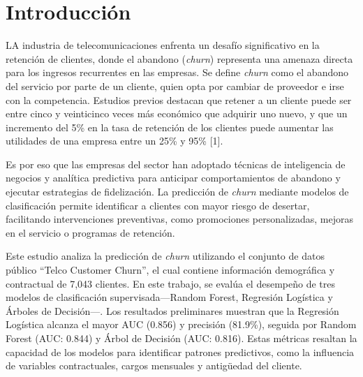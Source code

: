 \documentclass[conference]{IEEEtran}
\begin{document}

\section{Introducción}
LA industria de telecomunicaciones enfrenta un desafío significativo en la retención de clientes, donde el abandono (\emph{churn}) representa una amenaza directa para los ingresos recurrentes en las empresas. Se define \emph{churn} como el abandono del servicio por parte de un cliente, quien opta por cambiar de proveedor e irse con la competencia. Estudios previos destacan que retener a un cliente puede ser entre cinco y veinticinco veces más económico que adquirir uno nuevo, y que un incremento del 5\% en la tasa de retención de los clientes puede aumentar las utilidades de una empresa entre un 25\% y 95\% [1].

Es por eso que las empresas del sector han adoptado técnicas de inteligencia de negocios y analítica predictiva para anticipar comportamientos de abandono y ejecutar estrategias de fidelización. La predicción de \emph{churn} mediante modelos de clasificación permite identificar a clientes con mayor riesgo de desertar, facilitando intervenciones preventivas, como promociones personalizadas, mejoras en el servicio o programas de retención.

Este estudio analiza la predicción de \emph{churn} utilizando el conjunto de datos público “Telco Customer Churn”, el cual contiene información demográfica y contractual de 7,043 clientes. En este trabajo, se evalúa el desempeño de tres modelos de clasificación supervisada—Random Forest, Regresión Logística y Árboles de Decisión—. Los resultados preliminares muestran que la Regresión Logística alcanza el mayor AUC (0.856) y precisión (81.9\%), seguida por Random Forest (AUC: 0.844) y Árbol de Decisión (AUC: 0.816). Estas métricas resaltan la capacidad de los modelos para identificar patrones predictivos, como la influencia de variables contractuales, cargos mensuales y antigüedad del cliente.
\end{document}
